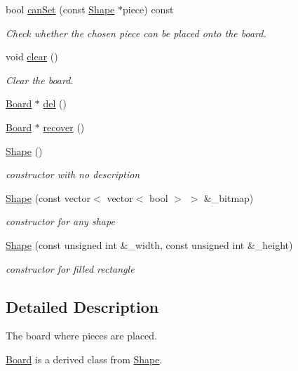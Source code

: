 \begin{DoxyCompactItemize}
bool \mbox{\hyperlink{class_board_a7a5e0f3151c694c1212e2b88eb51c57c}{can\+Set}} (const \mbox{\hyperlink{class_shape}{Shape}} $\ast$piece) const
\begin{DoxyCompactList}\small\item\em Check whether the chosen piece can be placed onto the board. \end{DoxyCompactList}\item 
void \mbox{\hyperlink{class_board_af74f0d4b43e5aa3faea16d7c6407b05e}{clear}} ()
\begin{DoxyCompactList}\small\item\em Clear the board. \end{DoxyCompactList}\item 
\mbox{\hyperlink{class_board}{Board}} $\ast$ \mbox{\hyperlink{class_board_adb5a66738afb0cc79313fac0a2dda590}{del}} ()
\item 
\mbox{\hyperlink{class_board}{Board}} $\ast$ \mbox{\hyperlink{class_board_a1de10b962518cea6081b3cb86d2bbf92}{recover}} ()
\item 
\mbox{\hyperlink{class_board_aaa8d87171e65e0d8ba3c5459978992a7}{Shape}} ()
\begin{DoxyCompactList}\small\item\em constructor with no description \end{DoxyCompactList}\item 
\mbox{\hyperlink{class_board_a8b614d73e9091d05a3e8b5a119bf509a}{Shape}} (const vector$<$ vector$<$ bool $>$ $>$ \&\+\_\+bitmap)
\begin{DoxyCompactList}\small\item\em constructor for any shape \end{DoxyCompactList}\item 
\mbox{\hyperlink{class_board_a37e0820a3b0346435b5fa57761480b32}{Shape}} (const unsigned int \&\+\_\+width, const unsigned int \&\+\_\+height)
\begin{DoxyCompactList}\small\item\em constructor for filled rectangle \end{DoxyCompactList}\end{DoxyCompactItemize}


\subsection{Detailed Description}
The board where pieces are placed. 

\mbox{\hyperlink{class_board}{Board}} is a derived class from \mbox{\hyperlink{class_shape}{Shape}}. 

